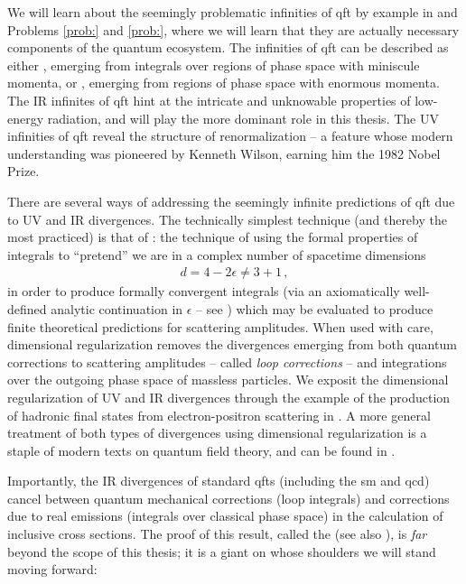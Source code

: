 We will  learn about the seemingly problematic infinities of \gls{qft} by example in  and Problems \ref{prob:} and \ref{prob:},  where we will learn that they are actually necessary components of the quantum ecosystem.
%
The infinities of \gls{qft} can be described as either , emerging from integrals over regions of phase space with miniscule momenta, or , emerging from regions of phase space with enormous momenta.
%
The IR infinites of \gls{qft} hint at the intricate and unknowable properties of low-energy radiation, and will play the more dominant role in this thesis.
%
The UV infinities of \gls{qft} reveal the structure of renormalization -- a feature whose modern understanding was pioneered by Kenneth Wilson, earning him the 1982 Nobel Prize.




There are several ways of addressing the seemingly infinite predictions of \gls{qft} due to UV and IR divergences.
%
The technically simplest technique (and thereby the most practiced) is that of :
%
the technique of using the formal properties of integrals to ``pretend'' we are in a complex number of spacetime dimensions
\begin{align}
    d = 4 - 2\epsilon \neq 3 + 1
    \,,
\end{align}
in order to produce formally convergent integrals (via an axiomatically well-defined analytic continuation in \(\epsilon\) -- see \Reff{}) which may be evaluated to produce finite theoretical predictions for scattering amplitudes.
%
When used with care, dimensional regularization removes the divergences emerging from both quantum corrections to scattering amplitudes -- called \textit{loop corrections} -- and integrations over the outgoing phase space of massless particles.
%
We exposit the dimensional regularization of UV and IR divergences through the example of the production of hadronic final states from electron-positron scattering in .
%
A more general treatment of both types of divergences using dimensional regularization is a staple of modern texts on quantum field theory, and can be found in .





Importantly, the IR divergences of standard \glspl{qft} (including the \gls{sm} and \gls{qcd}) cancel between quantum mechanical corrections (loop integrals) and corrections due to real emissions (integrals over classical phase space) in the calculation of inclusive cross sections.
%
The proof of this result, called the  \cite{} (see also \Reff{}), is \textit{far} beyond the scope of this thesis;
%
it is a giant on whose shoulders we will stand moving forward:

